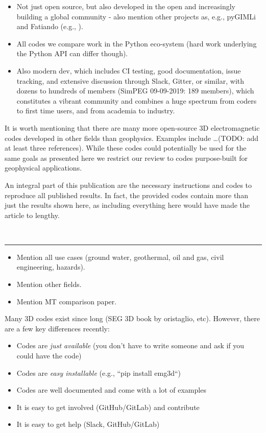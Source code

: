 \documentclass[
    paper,
  ]{geophysics}
\begin{document}
\begin{itemize}
  \item Not just open source, but also developed in the open and increasingly
    building a global community - also mention other projects as, e.g., pyGIMLi
    \citep{CAG.17.Rucker} and Fatiando (e.g., \cite{JOSS.18.Uieda}).
  \item All codes we compare work in the Python eco-system (hard work
    underlying the Python API can differ though).
  \item Also modern dev, which includes CI testing, good documentation, issue
    tracking, and extensive discussion through Slack, Gitter, or similar, with
    dozens to hundreds of members (SimPEG 09-09-2019: 189 members), which
    constitutes a vibrant community and combines a huge spectrum from coders to
    first time users, and from academia to industry.
\end{itemize}

It is worth mentioning that there are many more open-source 3D electromagnetic
codes developed in other fields than geophysics. Examples include \dots (TODO:
add at least three references). While these codes could potentially be used for
the same goals as presented here we restrict our review to codes purpose-built
for geophysical applications.

An integral part of this publication are the necessary instructions and codes
to reproduce all published results. In fact, the provided codes contain more
than just the results shown here, as including everything here would have made
the article to lengthy.

~\\ \hrule

\begin{itemize}
  \item Mention all use cases (ground water, geothermal, oil and gas, civil
        engineering, hazards).
  \item Mention other fields.
  \item Mention MT comparison paper.
\end{itemize}


Many 3D codes exist since long (SEG 3D book by oristaglio, etc). However, there
are a few key differences recently:

\begin{itemize}
  \item Codes are \emph{just available} (you don't have to write someone and
    ask if you could have the code)
  \item Codes are \emph{easy installable} (e.g., ``pip install emg3d``)
  \item Codes are well documented and come with a lot of examples
  \item It is easy to get involved (GitHub/GitLab) and contribute
  \item It is easy to get help (Slack, GitHub/GitLab)
\end{itemize}
\end{document}
